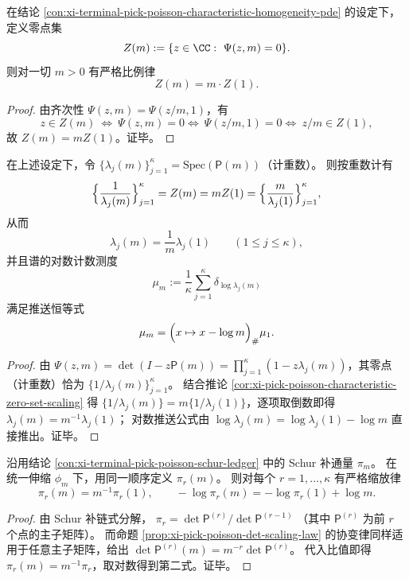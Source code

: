 \begin{corollary}[零点集的严格缩放]\label{cor:xi-pick-poisson-characteristic-zero-set-scaling}
在结论 \ref{con:xi-terminal-pick-poisson-characteristic-homogeneity-pde} 的设定下，定义零点集
\[
Z(m):=\{z\in\CC:\ \Psi(z,m)=0\}.
\]
则对一切 \(m>0\) 有严格比例律
\[
Z(m)=m\cdot Z(1).
\]
\end{corollary}
\begin{proof}
由齐次性 \(\Psi(z,m)=\Psi(z/m,1)\)，有
\[
z\in Z(m)\ \Longleftrightarrow\ \Psi(z,m)=0
\Longleftrightarrow\ \Psi(z/m,1)=0
\Longleftrightarrow\ z/m\in Z(1),
\]
故 \(Z(m)=mZ(1)\)。证毕。
\end{proof}

\begin{corollary}[谱倒数的对数平移不变量]\label{cor:xi-pick-poisson-spectrum-log-translation-invariant}
在上述设定下，令 \(\{\lambda_j(m)\}_{j=1}^{\kappa}=\mathrm{Spec}(\mathsf P(m))\)（计重数）。
则按重数计有
\[
\Bigl\{\frac{1}{\lambda_j(m)}\Bigr\}_{j=1}^{\kappa}=Z(m)=mZ(1)
=\Bigl\{\frac{m}{\lambda_j(1)}\Bigr\}_{j=1}^{\kappa},
\]
从而
\[
\lambda_j(m)=\frac{1}{m}\lambda_j(1)\qquad(1\le j\le\kappa),
\]
并且谱的对数计数测度
\[
\mu_m:=\frac{1}{\kappa}\sum_{j=1}^{\kappa}\delta_{\log \lambda_j(m)}
\]
满足推送恒等式
\[
\mu_m=\Bigl(x\mapsto x-\log m\Bigr)_{\#}\mu_1.
\]
\end{corollary}
\begin{proof}
由 \(\Psi(z,m)=\det(I-z\mathsf P(m))=\prod_{j=1}^{\kappa}(1-z\lambda_j(m))\)，其零点（计重数）恰为 \(\{1/\lambda_j(m)\}_{j=1}^{\kappa}\)。
结合推论 \ref{cor:xi-pick-poisson-characteristic-zero-set-scaling} 得 \(\{1/\lambda_j(m)\}=m\{1/\lambda_j(1)\}\)，逐项取倒数即得 \(\lambda_j(m)=m^{-1}\lambda_j(1)\)；
对数推送公式由 \(\log\lambda_j(m)=\log\lambda_j(1)-\log m\) 直接推出。证毕。
\end{proof}

\begin{conclusion}\label{con:xi-terminal-pick-poisson-schur-ledger-homothetic-scaling}
沿用结论 \ref{con:xi-terminal-pick-poisson-schur-ledger} 中的 Schur 补通量 \(\pi_m\)。
在统一伸缩 \(\phi_m\) 下，用同一顺序定义 \(\pi_r(m)\)。
则对每个 \(r=1,\dots,\kappa\) 有严格缩放律
\[
\boxed{\;\pi_r(m)=m^{-1}\pi_r(1),\qquad -\log\pi_r(m)=-\log\pi_r(1)+\log m.\;}
\]
\end{conclusion}
\begin{proof}
由 Schur 补链式分解，
\(
\pi_r=\det\mathsf P^{(r)}/\det\mathsf P^{(r-1)}
\)
（其中 \(\mathsf P^{(r)}\) 为前 \(r\) 个点的主子矩阵）。
而命题 \ref{prop:xi-pick-poisson-det-scaling-law} 的协变律同样适用于任意主子矩阵，给出
\(
\det\mathsf P^{(r)}(m)=m^{-r}\det\mathsf P^{(r)}
\)。
代入比值即得 \(\pi_r(m)=m^{-1}\pi_r\)，取对数得到第二式。证毕。
\end{proof}

